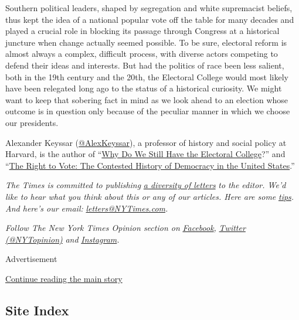 Southern political leaders, shaped by segregation and white supremacist
beliefs, thus kept the idea of a national popular vote off the table for
many decades and played a crucial role in blocking its passage through
Congress at a historical juncture when change actually seemed possible.
To be sure, electoral reform is almost always a complex, difficult
process, with diverse actors competing to defend their ideas and
interests. But had the politics of race been less salient, both in the
19th century and the 20th, the Electoral College would most likely have
been relegated long ago to the status of a historical curiosity. We
might want to keep that sobering fact in mind as we look ahead to an
election whose outcome is in question only because of the peculiar
manner in which we choose our presidents.

Alexander Keyssar
(\href{https://twitter.com/alexkeyssar?lang=en}{@AlexKeyssar}), a
professor of history and social policy at Harvard, is the author of
``\href{https://www.hup.harvard.edu/catalog.php?isbn=9780674660151\#:~:text=After\%20tracing\%20the\%20Electoral\%20College's,showing\%20why\%20each\%20has\%20failed.}{Why
Do We Still Have the Electoral College}?'' and
``\href{https://www.basicbooks.com/titles/alexander-keyssar/the-right-to-vote/9780465005024/}{The
Right to Vote: The Contested History of Democracy in the United
States}.''

\emph{The Times is committed to publishing}
\href{https://www.nytimes3xbfgragh.onion/2019/01/31/opinion/letters/letters-to-editor-new-york-times-women.html}{\emph{a
diversity of letters}} \emph{to the editor. We'd like to hear what you
think about this or any of our articles. Here are some}
\href{https://help.nytimes3xbfgragh.onion/hc/en-us/articles/115014925288-How-to-submit-a-letter-to-the-editor}{\emph{tips}}\emph{.
And here's our email:}
\href{mailto:letters@NYTimes.com}{\emph{letters@NYTimes.com}}\emph{.}

\emph{Follow The New York Times Opinion section on}
\href{https://www.facebookcorewwwi.onion/nytopinion}{\emph{Facebook}}\emph{,}
\href{http://twitter.com/NYTOpinion}{\emph{Twitter (@NYTopinion)}}
\emph{and}
\href{https://www.instagram.com/nytopinion/}{\emph{Instagram}}\emph{.}

Advertisement

\protect\hyperlink{after-bottom}{Continue reading the main story}

\hypertarget{site-index}{%
\subsection{Site Index}\label{site-index}}

